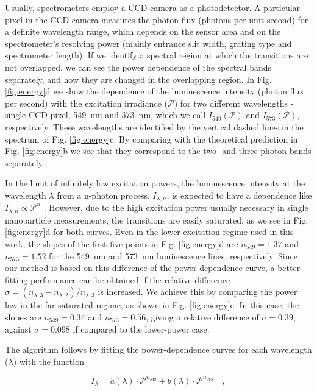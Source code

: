 \documentclass[journal=jacsat,manuscript=article, layout=twocolumn]{achemso}
\begin{document}
Usually, spectrometers employ a CCD camera as a photodetector. A particular pixel in the CCD camera measures the photon flux (photons per unit second) for a definite wavelength range, which depends on the sensor area and on the spectrometer's resolving power (mainly entrance slit width, grating type and spectrometer length). If we identify a spectral region at which the transitions are not overlapped, we can see the power dependence of the spectral bands separately, and how they are changed in the overlapping region. In Fig. \ref{fig:energy}d we show the dependence of the luminescence intensity (photon flux per second) with the excitation irradiance ($\mathcal{P}$) for two different wavelengths - single CCD pixel, \SI{549}{\nano\meter} and \SI{573}{\nano\meter}, which we call $I_{549}(\mathcal{P})$ and $I_{573}(\mathcal{P})$, respectively. These wavelengths are identified by the vertical dashed lines in the spectrum of Fig. \ref{fig:energy}c. By comparing with the theoretical prediction in Fig. \ref{fig:energy}b we see that they correspond to the two- and three-photon bands separately. 

In the limit of infinitely low excitation powers, the luminescence intensity at the wavelength $\lambda$ from a n-photon process, $I_{\lambda, n}$, is expected to have a dependence like $I_{\lambda, n} \propto \mathcal{P}^n$ \cite{Pollnau_2000}. However, due to the high excitation power usually necessary in single nanoparticle measurements, the transitions are easily saturated, as we see in Fig. \ref{fig:energy}d for both curves. Even in the lower excitation regime used in this work, the slopes of the first five points in Fig. \ref{fig:energy}d are $n_{549} = 1.37$ and $n_{573} = 1.52$ for the \SI{549}{\nano\meter} and \SI{573}{\nano\meter} luminescence lines, respectively. Since our method is based on this difference of the power-dependence curve, a better fitting performance can be obtained if the relative difference $\sigma = (n_{\lambda, 3} - n_{\lambda, 2})/n_{\lambda, 3}$ is increased. We achieve this by comparing the power law in the far-saturated regime, as shown in Fig. \ref{fig:energy}e. In this case, the slopes are $n_{549} = 0.34$ and $n_{573} = 0.56$, giving a relative difference of $\sigma = 0.39$, against $\sigma = 0.098$ if compared to the lower-power case.

The algorithm follows by fitting the power-dependence curves for each wavelength ($\lambda$) with the function \cite{Galindo_2022}

\begin{equation} \label{eq:fitting_model}
I_{\lambda} = a(\lambda) \cdot \mathcal{P}^{n_{549}} + b(\lambda) \cdot \mathcal{P}^{n_{573}} \quad ,
\end{equation}
\end{document}
